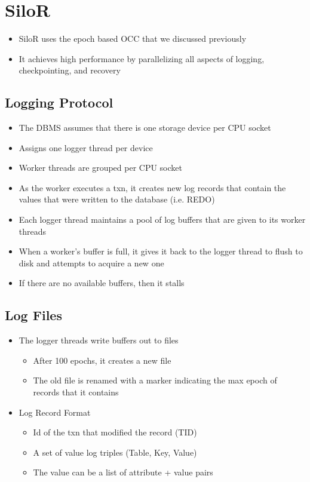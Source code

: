 \documentclass[11pt]{article}
\begin{document}
\section{SiloR ~\cite{zheng-osdi14}}
    \begin{itemize}
        \item SiloR uses the epoch based OCC that we discussed previously
        \item It achieves high performance by parallelizing all aspects of logging, checkpointing, and recovery
    \end{itemize}

    \subsection*{Logging Protocol}
    \begin{itemize}
        \item The DBMS assumes that there is one storage device per CPU socket
        \item Assigns one logger thread per device
        \item Worker threads are grouped per CPU socket
        \item As the worker executes a txn, it creates new log records that contain the values that were written to the database (i.e. REDO)
        \item Each logger thread maintains a pool of log buffers that are given to its worker threads
        \item When a worker's buffer is full, it gives it back to the logger thread to flush to disk and attempts to acquire a new one
        \item If there are no available buffers, then it stalls
    \end{itemize}

    \subsection*{Log Files}
    \begin{itemize}
        \item The logger threads write buffers out to files
        \begin{itemize}
            \item After 100 epochs, it creates a new file
            \item The old file is renamed with a marker indicating the max epoch of records that it contains
        \end{itemize}
        \item Log Record Format
        \begin{itemize}
            \item Id of the txn that modified the record (TID)
            \item A set of value log triples (Table, Key, Value)
            \item The value can be a list of attribute + value pairs
        \end{itemize}
    \end{itemize}
\end{document}
